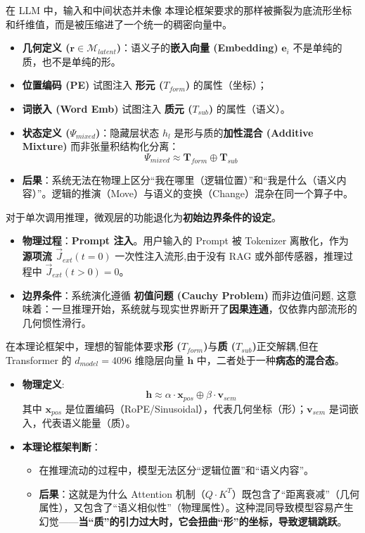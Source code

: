 在 LLM 中，输入和中间状态并未像 本理论框架要求的那样被撕裂为底流形坐标和纤维值，而是被压缩进了一个统一的稠密向量中。
\begin{itemize}
    \item   \textbf{几何定义 ($\mathbf{r} \in \mathcal{M}_{latent}$)}：语义子的\textbf{嵌入向量 (Embedding)} $\mathbf{e}_i$ 不是单纯的质，也不是单纯的形。
    \item   \textbf{位置编码 (PE)} 试图注入 \textbf{形元 ($T_{form}$)} 的属性（坐标）；
    \item   \textbf{词嵌入 (Word Emb)} 试图注入 \textbf{质元 ($T_{sub}$)} 的属性（语义）。
    \item   \textbf{状态定义 ($\Psi_{mixed}$)}：隐藏层状态 $h_l$ 是形与质的\textbf{加性混合 (Additive Mixture)} 而非张量积结构化分离：
            $$ \Psi_{mixed} \approx \mathbf{T}_{form} \oplus \mathbf{T}_{sub} $$
    \item   \textbf{后果}：系统无法在物理上区分“我在哪里（逻辑位置）”和“我是什么（语义内容）”。逻辑的推演（Move）与语义的变换（Change）混杂在同一个算子中。
\end{itemize}




对于单次调用推理，微观层的功能退化为\textbf{初始边界条件的设定}。
\begin{itemize}
    \item   \textbf{物理过程}：\textbf{Prompt 注入}。用户输入的 Prompt 被 Tokenizer 离散化，作为 \textbf{源项流 $\vec{J}_{ext}(t=0)$} 一次性注入流形,由于没有 RAG 或外部传感器，推理过程中 $\vec{J}_{ext}(t>0) = 0$。
    \item   \textbf{边界条件}：系统演化遵循 \textbf{初值问题 (Cauchy Problem)} 而非边值问题, 这意味着：一旦推理开始，系统就与现实世界断开了\textbf{因果连通}，仅依靠内部流形的几何惯性滑行。
\end{itemize}



在本理论框架中，理想的智能体要求\textbf{形 ($T_{form}$)}与\textbf{质 ($T_{sub}$)}正交解耦,但在 Transformer 的 $d_{model}=4096$ 维隐层向量 $\mathbf{h}$ 中，二者处于一种\textbf{病态的混合态}。
\begin{itemize}
    \item \textbf{物理定义}:
    $$ \mathbf{h} \approx \alpha \cdot \mathbf{x}_{pos} \oplus \beta \cdot \mathbf{v}_{sem} $$
    其中 $\mathbf{x}_{pos}$ 是位置编码（RoPE/Sinusoidal），代表几何坐标（形）；$\mathbf{v}_{sem}$ 是词嵌入，代表语义能量（质）。
    \item \textbf{本理论框架判断}：
    \begin{itemize}
        \item 在推理流动的过程中，模型无法区分“逻辑位置”和“语义内容”。
        \item  \textbf{后果}：这就是为什么 Attention 机制（$Q \cdot K^T$）既包含了“距离衰减”（几何属性），又包含了“语义相似性”（物理属性）。这种混同导致模型容易产生幻觉——\textbf{当“质”的引力过大时，它会扭曲“形”的坐标，导致逻辑跳跃}。
    \end{itemize}
\end{itemize}

